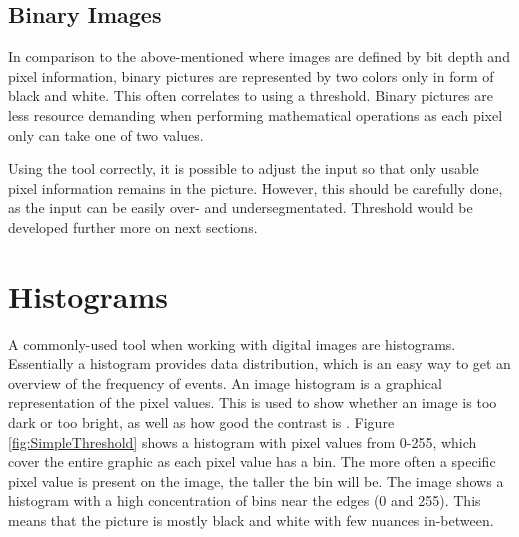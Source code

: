 \subsection{Binary Images}
In comparison to the above-mentioned where images are defined by bit depth and pixel information, binary pictures are represented by two colors only in form of black and white. This often correlates to using a threshold. Binary pictures are less resource demanding when performing mathematical operations as each pixel only can take one of two values.

Using the tool correctly, it is possible to adjust the input so that only usable pixel information remains in the picture. However, this should be carefully done, as the input can be easily over- and undersegmentated. Threshold would be developed further more on next sections.

\section{Histograms}
A commonly-used tool when working with digital images are histograms. Essentially a histogram provides data distribution, which is an easy way to get an overview of the frequency of events. An image histogram is a graphical representation of the pixel values. This is used to show whether an image is too dark or too bright, as well as how good the contrast is \citep{ip_book}. Figure \ref{fig:SimpleThreshold} shows a histogram with pixel values from 0-255, which cover the entire graphic as each pixel value has a bin. The more often a specific pixel value is present on the image, the taller the bin will be. The image shows a histogram with a high concentration of bins near the edges (0 and 255). This means that the picture is mostly black and white with few nuances in-between.

